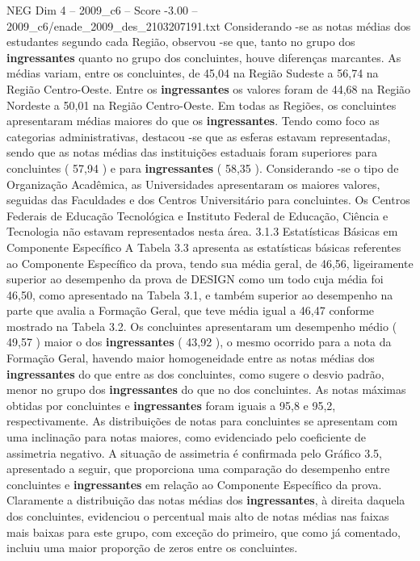 \begin{textsample}{NEG Dim 4 – 2009\_c6 – Score -3.00 – 2009\_c6/enade\_2009\_des\_2103207191.txt}
Considerando -se as notas médias dos estudantes segundo cada Região, observou -se que, tanto no grupo dos \textbf{ingressantes} quanto no grupo dos concluintes, houve diferenças marcantes.
As médias variam, entre os concluintes, de 45,04 na Região Sudeste a 56,74 na Região Centro-Oeste.
Entre os \textbf{ingressantes} os valores foram de 44,68 na Região Nordeste a 50,01 na Região Centro-Oeste.
Em todas as Regiões, os concluintes apresentaram médias maiores do que os \textbf{ingressantes}.
Tendo como foco as categorias administrativas, destacou -se que as esferas estavam representadas, sendo que as notas médias das instituições estaduais foram superiores para concluintes ( 57,94 ) e para \textbf{ingressantes} ( 58,35 ).
Considerando -se o tipo de Organização Acadêmica, as Universidades apresentaram os maiores valores, seguidas das Faculdades e dos Centros Universitário para concluintes.
Os Centros Federais de Educação Tecnológica e Instituto Federal de Educação, Ciência e Tecnologia não estavam representados nesta área. 3.1.3 Estatísticas Básicas em Componente Específico A Tabela 3.3 apresenta as estatísticas básicas referentes ao Componente Específico da prova, tendo sua média geral, de 46,56, ligeiramente superior ao desempenho da prova de DESIGN como um todo cuja média foi 46,50, como apresentado na Tabela 3.1, e também superior ao desempenho na parte que avalia a Formação Geral, que teve média igual a 46,47 conforme mostrado na Tabela 3.2.
Os concluintes apresentaram um desempenho médio ( 49,57 ) maior o dos \textbf{ingressantes} ( 43,92 ), o mesmo ocorrido para a nota da Formação Geral, havendo maior homogeneidade entre as notas médias dos \textbf{ingressantes} do que entre as dos concluintes, como sugere o desvio padrão, menor no grupo dos \textbf{ingressantes} do que no dos concluintes.
As notas máximas obtidas por concluintes e \textbf{ingressantes} foram iguais a 95,8 e 95,2, respectivamente.
As distribuições de notas para concluintes se apresentam com uma inclinação para notas maiores, como evidenciado pelo coeficiente de assimetria negativo.
A situação de assimetria é confirmada pelo Gráfico 3.5, apresentado a seguir, que proporciona uma comparação do desempenho entre concluintes e \textbf{ingressantes} em relação ao Componente Específico da prova.
Claramente a distribuição das notas médias dos \textbf{ingressantes}, à direita daquela dos concluintes, evidenciou o percentual mais alto de notas médias nas faixas mais baixas para este grupo, com exceção do primeiro, que como já comentado, incluiu uma maior proporção de zeros entre os concluintes.

\end{textsample}
